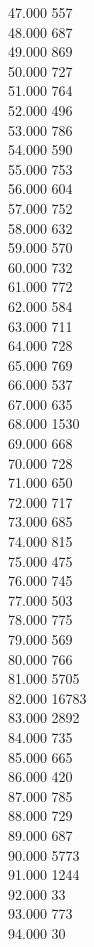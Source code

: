 { 47.000	557 \\
 48.000	687 \\
 49.000	869 \\
 50.000	727 \\
 51.000	764 \\
 52.000	496 \\
 53.000	786 \\
 54.000	590 \\
 55.000	753 \\
 56.000	604 \\
 57.000	752 \\
 58.000	632 \\
 59.000	570 \\
 60.000	732 \\
 61.000	772 \\
 62.000	584 \\
 63.000	711 \\
 64.000	728 \\
 65.000	769 \\
 66.000	537 \\
 67.000	635 \\
 68.000	1530 \\
 69.000	668 \\
 70.000	728 \\
 71.000	650 \\
 72.000	717 \\
 73.000	685 \\
 74.000	815 \\
 75.000	475 \\
 76.000	745 \\
 77.000	503 \\
 78.000	775 \\
 79.000	569 \\
 80.000	766 \\
 81.000	5705 \\
 82.000	16783 \\
 83.000	2892 \\
 84.000	735 \\
 85.000	665 \\
 86.000	420 \\
 87.000	785 \\
 88.000	729 \\
 89.000	687 \\
 90.000	5773 \\
 91.000	1244 \\
 92.000	33 \\
 93.000	773 \\
 94.000	30 \\
}
